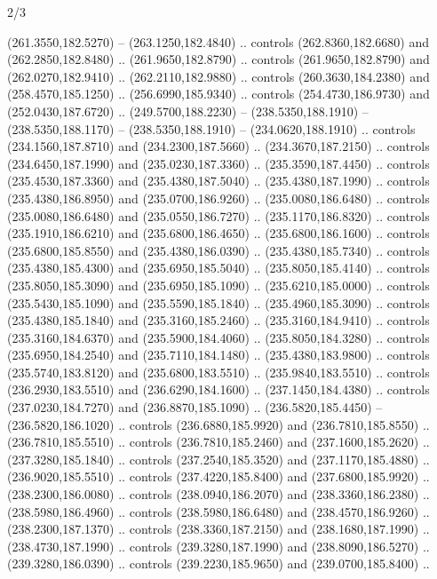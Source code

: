 \begin{flagdescription}{2/3}
\begin{scope}[xshift=0.5\flaglength,yshift=0.5\flagwidth,scale=\flagwidth/259.2]
\begin{scope}[y=0.8pt, x=0.8pt, yscale=-1,shift={(-243,-162)}]
      (261.3550,182.5270) -- (263.1250,182.4840) .. controls (262.8360,182.6680) and
      (262.2850,182.8480) .. (261.9650,182.8790) .. controls (261.9650,182.8790) and
      (262.0270,182.9410) .. (262.2110,182.9880) .. controls (260.3630,184.2380) and
      (258.4570,185.1250) .. (256.6990,185.9340) .. controls (254.4730,186.9730) and
      (252.0430,187.6720) .. (249.5700,188.2230) -- (238.5350,188.1910) --
      (238.5350,188.1170) -- (238.5350,188.1910) -- (234.0620,188.1910) .. controls
      (234.1560,187.8710) and (234.2300,187.5660) .. (234.3670,187.2150) .. controls
      (234.6450,187.1990) and (235.0230,187.3360) .. (235.3590,187.4450) .. controls
      (235.4530,187.3360) and (235.4380,187.5040) .. (235.4380,187.1990) .. controls
      (235.4380,186.8950) and (235.0700,186.9260) .. (235.0080,186.6480) .. controls
      (235.0080,186.6480) and (235.0550,186.7270) .. (235.1170,186.8320) .. controls
      (235.1910,186.6210) and (235.6800,186.4650) .. (235.6800,186.1600) .. controls
      (235.6800,185.8550) and (235.4380,186.0390) .. (235.4380,185.7340) .. controls
      (235.4380,185.4300) and (235.6950,185.5040) .. (235.8050,185.4140) .. controls
      (235.8050,185.3090) and (235.6950,185.1090) .. (235.6210,185.0000) .. controls
      (235.5430,185.1090) and (235.5590,185.1840) .. (235.4960,185.3090) .. controls
      (235.4380,185.1840) and (235.3160,185.2460) .. (235.3160,184.9410) .. controls
      (235.3160,184.6370) and (235.5900,184.4060) .. (235.8050,184.3280) .. controls
      (235.6950,184.2540) and (235.7110,184.1480) .. (235.4380,183.9800) .. controls
      (235.5740,183.8120) and (235.6800,183.5510) .. (235.9840,183.5510) .. controls
      (236.2930,183.5510) and (236.6290,184.1600) .. (237.1450,184.4380) .. controls
      (237.0230,184.7270) and (236.8870,185.1090) .. (236.5820,185.4450) --
      (236.5820,186.1020) .. controls (236.6880,185.9920) and (236.7810,185.8550) ..
      (236.7810,185.5510) .. controls (236.7810,185.2460) and (237.1600,185.2620) ..
      (237.3280,185.1840) .. controls (237.2540,185.3520) and (237.1170,185.4880) ..
      (236.9020,185.5510) .. controls (237.4220,185.8400) and (237.6800,185.9920) ..
      (238.2300,186.0080) .. controls (238.0940,186.2070) and (238.3360,186.2380) ..
      (238.5980,186.4960) .. controls (238.5980,186.6480) and (238.4570,186.9260) ..
      (238.2300,187.1370) .. controls (238.3360,187.2150) and (238.1680,187.1990) ..
      (238.4730,187.1990) .. controls (239.3280,187.1990) and (238.8090,186.5270) ..
      (239.3280,186.0390) .. controls (239.2230,185.9650) and (239.0700,185.8400) ..

\end{scope}
\end{scope}
\end{flagdescription}
